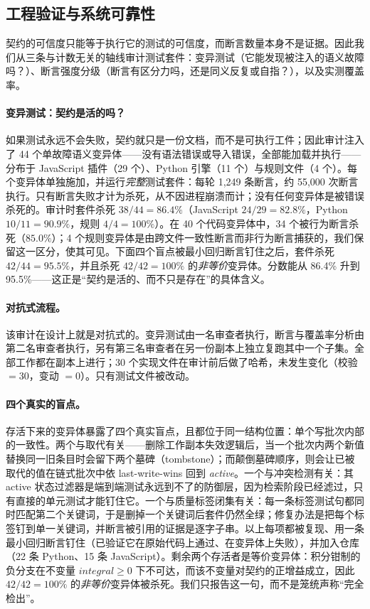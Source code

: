 \subsection{工程验证与系统可靠性}

契约的可信度只能等于执行它的测试的可信度，而断言数量本身不是证据。因此我们从三条与计数无关的轴线审计测试套件：变异测试（它能发现被注入的语义故障吗？）、断言强度分级（断言有区分力吗，还是同义反复或自指？），以及实测覆盖率。

\paragraph{变异测试：契约是活的吗？} 如果测试永远不会失败，契约就只是一份文档，而不是可执行工件；因此审计注入了 44 个单故障语义变异体——没有语法错误或导入错误，全部能加载并执行——分布于 JavaScript 插件（29 个）、Python 引擎（11 个）与规则文件（4 个）。每个变异体单独施加，并运行\emph{完整}测试套件：每轮 1{,}249 条断言，约 55{,}000 次断言执行。只有断言失败才计为杀死，从不因进程崩溃而计；没有任何变异体是被错误杀死的。审计时套件杀死 $38/44=86.4\%$（JavaScript $24/29=82.8\%$，Python $10/11=90.9\%$，规则 $4/4=100\%$）。在 40 个代码变异体中，34 个被行为断言杀死（$85.0\%$）；4 个规则变异体是由跨文件一致性断言而非行为断言捕获的，我们保留这一区分，使其可见。下面四个盲点被最小回归断言钉住之后，套件杀死 $42/44=95.5\%$，并且杀死 $42/42=100\%$ 的\emph{非等价}变异体。分数能从 86.4\% 升到 95.5\%——这正是“契约是活的、而不只是存在”的具体含义。

\paragraph{对抗式流程。} 该审计在设计上就是对抗式的。变异测试由一名审查者执行，断言与覆盖率分析由第二名审查者执行，另有第三名审查者在另一份副本上独立复跑其中一个子集。全部工作都在副本上进行；30 个实现文件在审计前后做了哈希，未发生变化（校验 $=30$，变动 $=0$）。只有测试文件被改动。

\paragraph{四个真实的盲点。} 存活下来的变异体暴露了四个真实盲点，且都位于同一结构位置：单个写批次内部的一致性。两个与取代有关——删除工作副本失效逻辑后，当一个批次内两个新值替换同一旧条目时会留下两个墓碑（tombstone）；而颠倒墓碑顺序，则会让已被取代的值在链式批次中依 last-write-wins 回到 \emph{active}。一个与冲突检测有关：其 active 状态过滤器是端到端测试永远到不了的防御层，因为检索阶段已经滤过，只有直接的单元测试才能钉住它。一个与质量标签闭集有关：每一条标签测试句都同时匹配第二个关键词，于是删掉一个关键词后套件仍然全绿；修复办法是把每个标签钉到单一关键词，并断言被引用的证据是逐字子串。以上每项都被复现、用一条最小回归断言钉住（已验证它在原始代码上通过、在变异体上失败），并加入仓库（22 条 Python、15 条 JavaScript）。剩余两个存活者是等价变异体：积分钳制的负分支在不变量 $\mathit{integral}\ge 0$ 下不可达，而该不变量对契约的正增益成立，因此 $42/42=100\%$ 的\emph{非等价}变异体被杀死。我们只报告这一句，而不是笼统声称“完全检出”。

